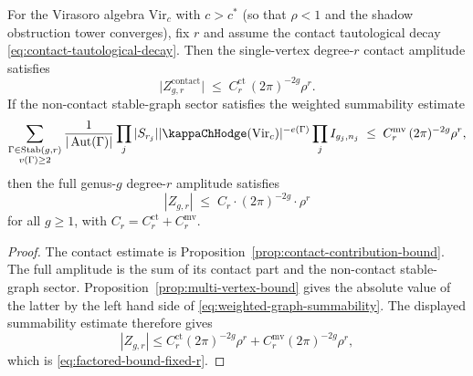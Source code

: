 \begin{theorem}
\label{thm:factored-bound-fixed-r}
For the Virasoro algebra $\mathrm{Vir}_c$ with $c > c^*$
\textup{(}so that $\rho < 1$ and the shadow obstruction tower converges\textup{)},
fix $r$ and assume the contact tautological decay
\eqref{eq:contact-tautological-decay}. Then the single-vertex
degree-$r$ contact amplitude satisfies
\[
\bigl|Z_{g,r}^{\mathrm{contact}}\bigr|
\;\leq\;
C_r^{\mathrm{ct}}\,(2\pi)^{-2g}\rho^r .
\]
If the non-contact stable-graph sector satisfies the weighted
summability estimate
\begin{equation}\label{eq:weighted-graph-summability}
\sum_{\substack{\Gamma\in \mathrm{Stab}(g,r)\\ v(\Gamma)\geq 2}}
\frac{1}{|\Aut(\Gamma)|}
\prod_j |S_{r_j}|
|\kappaChHodge(\mathrm{Vir}_c)|^{-e(\Gamma)}
\prod_j I_{g_j,n_j}
\;\leq\;
C_r^{\mathrm{mv}}\,(2\pi)^{-2g}\rho^r ,
\end{equation}
then the full genus-$g$ degree-$r$ amplitude satisfies
\begin{equation}\label{eq:factored-bound-fixed-r}
|Z_{g,r}| \;\leq\; C_r \cdot (2\pi)^{-2g} \cdot \rho^r
\end{equation}
for all $g \geq 1$, with $C_r=C_r^{\mathrm{ct}}+C_r^{\mathrm{mv}}$.
\end{theorem}

\begin{proof}
The contact estimate is Proposition~\ref{prop:contact-contribution-bound}.
The full amplitude is the sum of its contact part and the non-contact
stable-graph sector. Proposition~\ref{prop:multi-vertex-bound} gives
the absolute value of the latter by the left hand side of
\eqref{eq:weighted-graph-summability}. The displayed summability
estimate therefore gives
\[
|Z_{g,r}|
\leq
C_r^{\mathrm{ct}}(2\pi)^{-2g}\rho^r
+
C_r^{\mathrm{mv}}(2\pi)^{-2g}\rho^r ,
\]
which is \eqref{eq:factored-bound-fixed-r}.
\end{proof}

